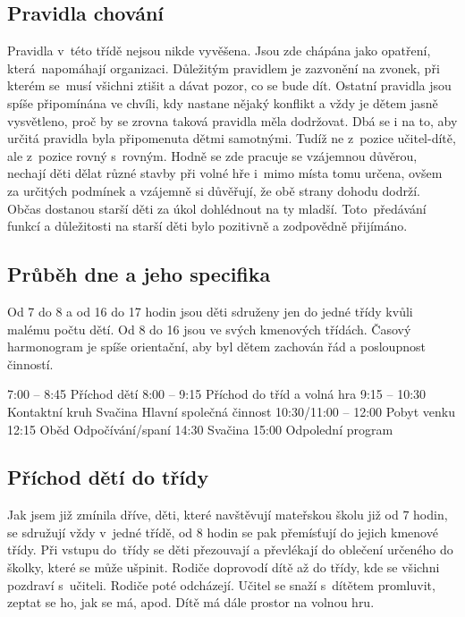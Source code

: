		\subsection{Pravidla chování}
			Pravidla v této třídě nejsou nikde vyvěšena. Jsou zde chápána jako opatření, která napomáhají organizaci. Důležitým pravidlem je zazvonění na zvonek, při kterém se musí všichni ztišit a dávat pozor, co se bude dít. Ostatní pravidla jsou spíše připomínána ve chvíli, kdy nastane nějaký konflikt a vždy je dětem jasně vysvětleno, proč by se zrovna taková pravidla měla dodržovat. Dbá se i na to, aby určitá pravidla byla připomenuta dětmi samotnými. Tudíž ne z pozice učitel-dítě, ale z pozice rovný s rovným.
			Hodně se zde pracuje se vzájemnou důvěrou, nechají děti dělat různé stavby při volné hře i mimo místa tomu určena, ovšem za určitých podmínek a vzájemně si důvěřují, že obě strany dohodu dodrží. Občas dostanou starší děti za úkol dohlédnout na ty mladší. Toto předávání funkcí a důležitosti na starší děti bylo pozitivně  a zodpovědně přijímáno.

		\subsection{Průběh dne a jeho specifika}

			Od 7 do 8 a od 16 do 17 hodin jsou děti sdruženy jen do jedné třídy kvůli malému počtu dětí. Od 8 do 16 jsou ve svých kmenových třídách.
			Časový harmonogram je spíše orientační, aby byl dětem zachován řád a posloupnost činností. 

7:00 – 8:45		Příchod dětí
8:00 – 9:15		Příchod do tříd a volná hra
9:15 – 10:30		Kontaktní kruh
			Svačina
			Hlavní společná činnost
10:30/11:00 – 12:00	Pobyt venku
12:15			Oběd
			Odpočívání/spaní
14:30			Svačina
15:00			Odpolední program

		\subsection{Příchod dětí do třídy}
			Jak jsem již zmínila dříve, děti, které navštěvují mateřskou školu již od 7 hodin, se sdružují vždy v jedné třídě, od 8 hodin se pak přemísťují do jejich kmenové třídy. Při vstupu do třídy se děti přezouvají a převlékají do oblečení určeného do školky, které se může ušpinit. Rodiče doprovodí dítě až do třídy, kde se všichni pozdraví s učiteli. Rodiče poté odcházejí. Učitel se snaží s dítětem promluvit, zeptat se ho, jak se má, apod.  Dítě má dále prostor na volnou hru.

